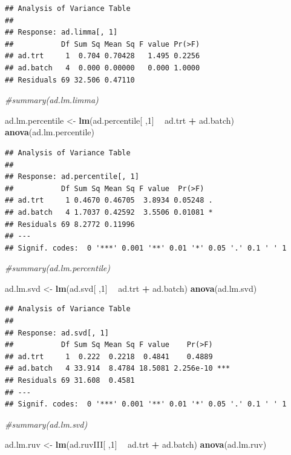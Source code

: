 \documentclass[]{book}
\newenvironment{Shaded}{\begin{snugshade}}{\end{snugshade}}
\newcommand{\KeywordTok}[1]{\textcolor[rgb]{0.13,0.29,0.53}{\textbf{#1}}}
\newcommand{\DecValTok}[1]{\textcolor[rgb]{0.00,0.00,0.81}{#1}}
\newcommand{\StringTok}[1]{\textcolor[rgb]{0.31,0.60,0.02}{#1}}
\newcommand{\CommentTok}[1]{\textcolor[rgb]{0.56,0.35,0.01}{\textit{#1}}}
\newcommand{\OperatorTok}[1]{\textcolor[rgb]{0.81,0.36,0.00}{\textbf{#1}}}
\newcommand{\NormalTok}[1]{#1}
\begin{document}
\begin{verbatim}
## Analysis of Variance Table
## 
## Response: ad.limma[, 1]
##           Df Sum Sq Mean Sq F value Pr(>F)
## ad.trt     1  0.704 0.70428   1.495 0.2256
## ad.batch   4  0.000 0.00000   0.000 1.0000
## Residuals 69 32.506 0.47110
\end{verbatim}

\begin{Shaded}
\begin{Highlighting}[]
\CommentTok{#summary(ad.lm.limma)}

\NormalTok{ad.lm.percentile <-}\StringTok{ }\KeywordTok{lm}\NormalTok{(ad.percentile[ ,}\DecValTok{1}\NormalTok{] }\OperatorTok{~}\StringTok{ }\NormalTok{ad.trt }\OperatorTok{+}\StringTok{ }\NormalTok{ad.batch)}
\KeywordTok{anova}\NormalTok{(ad.lm.percentile)}
\end{Highlighting}
\end{Shaded}

\begin{verbatim}
## Analysis of Variance Table
## 
## Response: ad.percentile[, 1]
##           Df Sum Sq Mean Sq F value  Pr(>F)  
## ad.trt     1 0.4670 0.46705  3.8934 0.05248 .
## ad.batch   4 1.7037 0.42592  3.5506 0.01081 *
## Residuals 69 8.2772 0.11996                  
## ---
## Signif. codes:  0 '***' 0.001 '**' 0.01 '*' 0.05 '.' 0.1 ' ' 1
\end{verbatim}

\begin{Shaded}
\begin{Highlighting}[]
\CommentTok{#summary(ad.lm.percentile)}

\NormalTok{ad.lm.svd <-}\StringTok{ }\KeywordTok{lm}\NormalTok{(ad.svd[ ,}\DecValTok{1}\NormalTok{] }\OperatorTok{~}\StringTok{ }\NormalTok{ad.trt }\OperatorTok{+}\StringTok{ }\NormalTok{ad.batch)}
\KeywordTok{anova}\NormalTok{(ad.lm.svd)}
\end{Highlighting}
\end{Shaded}

\begin{verbatim}
## Analysis of Variance Table
## 
## Response: ad.svd[, 1]
##           Df Sum Sq Mean Sq F value    Pr(>F)    
## ad.trt     1  0.222  0.2218  0.4841    0.4889    
## ad.batch   4 33.914  8.4784 18.5081 2.256e-10 ***
## Residuals 69 31.608  0.4581                      
## ---
## Signif. codes:  0 '***' 0.001 '**' 0.01 '*' 0.05 '.' 0.1 ' ' 1
\end{verbatim}

\begin{Shaded}
\begin{Highlighting}[]
\CommentTok{#summary(ad.lm.svd)}


\NormalTok{ad.lm.ruv <-}\StringTok{ }\KeywordTok{lm}\NormalTok{(ad.ruvIII[ ,}\DecValTok{1}\NormalTok{] }\OperatorTok{~}\StringTok{ }\NormalTok{ad.trt }\OperatorTok{+}\StringTok{ }\NormalTok{ad.batch)}
\KeywordTok{anova}\NormalTok{(ad.lm.ruv)}
\end{Highlighting}
\end{Shaded}
\end{document}
